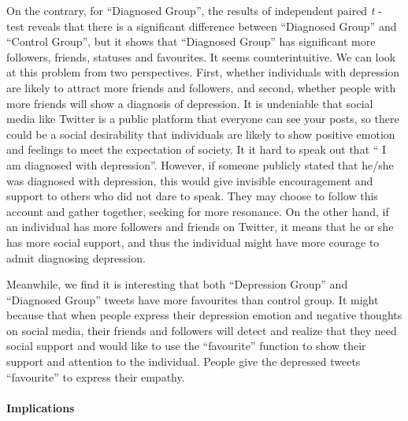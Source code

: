 \documentclass[]{article}
\let\oldparagraph\paragraph
\renewcommand{\paragraph}[1]{\oldparagraph{#1}\mbox{}}
\begin{document}
On the contrary, for ``Diagnosed Group'', the results of independent
paired \emph{t} - test reveals that there is a significant difference
between ``Diagnosed Group'' and ``Control Group'', but it shows that
``Diagnosed Group'' has significant more followers, friends, statuses
and favourites. It seems counterintuitive. We can look at this problem
from two perspectives. First, whether individuals with depression are
likely to attract more friends and followers, and second, whether people
with more friends will show a diagnosis of depression. It is undeniable
that social media like Twitter is a public platform that everyone can
see your posts, so there could be a social desirability that individuals
are likely to show positive emotion and feelings to meet the expectation
of society. It it hard to speak out that `` I am diagnosed with
depression''. However, if someone publicly stated that he/she was
diagnosed with depression, this would give invisible encouragement and
support to others who did not dare to speak. They may choose to follow
this account and gather together, seeking for more resonance. On the
other hand, if an individual has more followers and friends on Twitter,
it means that he or she has more social support, and thus the individual
might have more courage to admit diagnosing depression.

Meanwhile, we find it is interesting that both ``Depression Group'' and
``Diagnosed Group'' tweets have more favourites than control group. It
might because that when people express their depression emotion and
negative thoughts on social media, their friends and followers will
detect and realize that they need social support and would like to use
the ``favourite'' function to show their support and attention to the
individual. People give the depressed tweets ``favourite'' to express
their empathy.

\hypertarget{implications}{%
\paragraph{Implications}\label{implications}}
\end{document}
